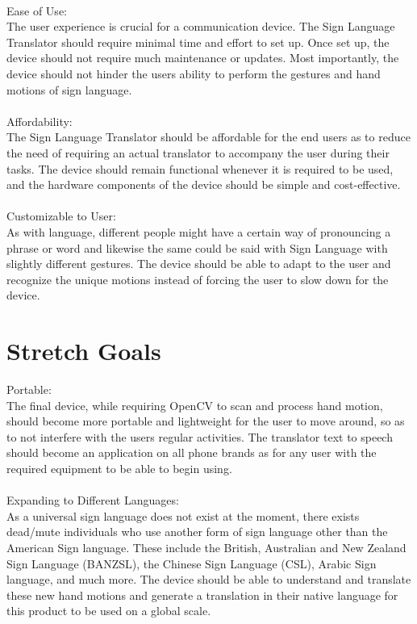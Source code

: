 \documentclass{article}
\begin{document}
~\\Ease of Use:\\
The user experience is crucial for a communication device. The Sign Language Translator should require minimal time 
and effort to set up. Once set up, the device should not require much maintenance or updates. Most importantly,
the device should not hinder the user\textquotesingle s ability to perform the gestures and hand motions of sign language.\\

~\\Affordability:\\
The Sign Language Translator should be affordable for the end users as to reduce the need of requiring an actual translator 
to accompany the user during their tasks. The device should remain functional whenever it is required to be used, and the hardware components
 of the device should be simple and cost-effective.\\

~\\Customizable to User:\\
As with language, different people might have a certain way of pronouncing a phrase or word and likewise the same could be said with Sign Language 
with slightly different gestures. The device should be able to adapt to the user and recognize the unique motions instead of forcing the user to 
slow down for the device. 

\section{Stretch Goals}

Portable:\\
The final device, while requiring OpenCV to scan and process hand motion, should become more portable and lightweight for the user
to move around, so as to not interfere with the user\textquotesingle s regular activities. The translator text to speech should
become an application on all phone brands as for any user with the required equipment to be able to begin using.\\

~\\Expanding to Different Languages:\\
As a universal sign language does not exist at the moment, there exists dead/mute individuals who use another form of sign language
other than the American Sign language. These include the British, Australian and New Zealand Sign Language (BANZSL), the Chinese Sign
Language (CSL), Arabic Sign language, and much more. The device should be able to understand and translate these new hand motions and
generate a translation in their native language for this product to be used on a global scale.\\
\end{document}
